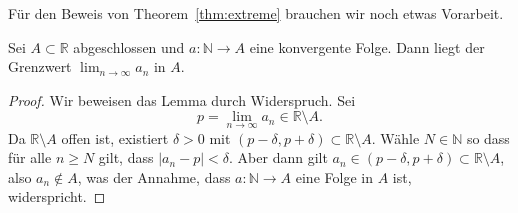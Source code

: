 \documentclass[../main.tex]{subfiles}
\begin{document}
Für den Beweis von Theorem~\ref{thm:extreme}
brauchen wir noch etwas Vorarbeit.

\begin{lemma*}
  Sei $A \subset \mathbb{R}$ abgeschlossen
  und $a \colon \mathbb{N} \to A$ eine konvergente
  Folge. Dann liegt der
  Grenzwert $\lim_{n \to \infty} a_n$ in $A$.
\end{lemma*}

\begin{proof}
  Wir beweisen das Lemma durch Widerspruch.
  Sei
  \[
    p = \lim_{n \to \infty} a_n \in \mathbb{R} \setminus A.
  \]
  Da $\mathbb{R} \setminus A$ offen ist,
  existiert $\delta > 0$ mit $(p - \delta, p + \delta)
  \subset \mathbb{R} \setminus A$.
  Wähle $N \in \mathbb{N}$  so dass für alle $n \geq N$
  gilt, dass $|a_n - p| < \delta$.
  Aber dann gilt $a_n \in (p - \delta, p + \delta)
  \subset \mathbb{R} \setminus A$,
  also $a_n \notin A$, was der Annahme, dass 
  $a \colon \mathbb{N} \to A$
  eine Folge in $A$ ist, widerspricht.
\end{proof}
\end{document}
